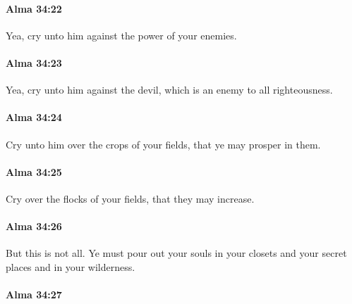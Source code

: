 		\paragraph{Alma 34:22} %
			\label{ALMA-34-22}

			Yea, cry unto him against the power of your enemies.

		\paragraph{Alma 34:23} %
			\label{ALMA-34-23}

			Yea, cry unto him against the devil, which is an enemy to all righteousness.

		\paragraph{Alma 34:24} %
			\label{ALMA-34-24}

			Cry unto him over the crops of your fields, that ye may prosper in them.

		\paragraph{Alma 34:25} %
			\label{ALMA-34-25}

			Cry over the flocks of your fields, that they may increase.

		\paragraph{Alma 34:26} %
			\label{ALMA-34-26}

			But this is not all.
			Ye must pour out your souls in your closets and your secret places
			and in your wilderness.

		\paragraph{Alma 34:27} %
			\label{ALMA-34-27}

